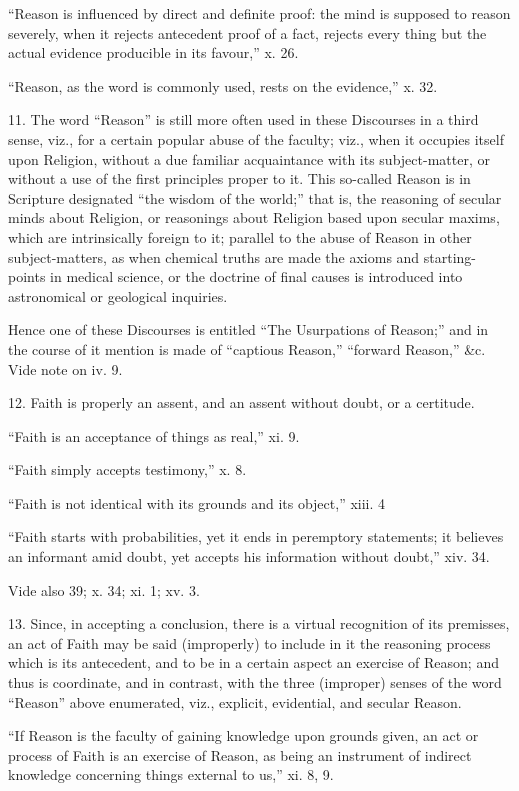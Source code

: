 ``Reason is influenced by direct and definite proof: the mind
is supposed to reason severely, when it rejects antecedent proof of
a fact, rejects every thing but the actual evidence producible in
its favour,'' x. 26.


``Reason, as the word is commonly used, rests on the
evidence,'' x. 32.


11. The word ``Reason'' is still more often used in these
Discourses in a third sense, viz., for a certain popular abuse of the
faculty; viz., when it occupies itself upon Religion, without a due
familiar acquaintance with its subject-matter, or without a use of the
first principles proper to it. This so-called Reason is in Scripture
designated ``the wisdom of the world;'' that is, the reasoning
of secular minds about Religion, or reasonings about Religion based
upon secular maxims, which are intrinsically foreign to it; parallel
to the abuse of Reason in other subject-matters, as when chemical
truths are made the axioms and starting-points in medical science, or
the doctrine of final causes is introduced into astronomical or
geological inquiries.


Hence one of these Discourses is entitled ``The Usurpations
of Reason;'' and in the course of it mention is made of
``captious Reason,'' ``forward Reason,'' \&c.
Vide note on iv. 9.


12. Faith is properly an assent, and an assent without doubt, or a
certitude.


``Faith is an acceptance of things as real,'' xi. 9.


``Faith simply accepts testimony,'' x. 8.


``Faith is not identical with its grounds and its
object,'' xiii. 4


``Faith starts with probabilities, yet it ends in peremptory
statements; it believes an informant amid doubt, yet accepts his
information without doubt,'' xiv. 34.


Vide also 39; x. 34; xi. 1; xv. 3.


13. Since, in accepting a conclusion, there is a virtual
recognition of its premisses, an act of Faith may be said (improperly)
to include in it the reasoning process which is its antecedent, and to
be in a certain aspect an exercise of Reason; and thus is coordinate,
and in contrast, with the three (improper) senses of the word
``Reason'' above enumerated, viz., explicit, evidential, and
secular Reason.


``If Reason is the faculty of gaining knowledge upon grounds
given, an act or process of Faith is an exercise of Reason, as being
an instrument of indirect knowledge concerning things external to
us,'' xi. 8, 9.


